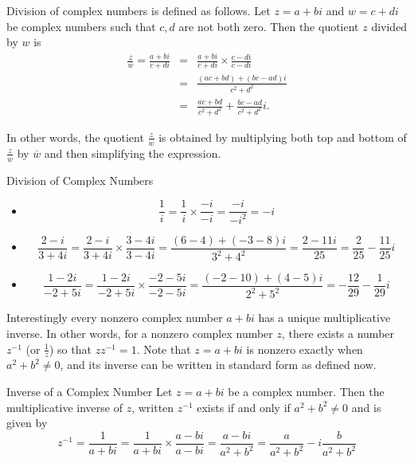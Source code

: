Division of complex numbers is defined as follows. Let $z=a+bi$ and $w=c+di$ be complex numbers such that $c,d$ are not both zero. Then the quotient $z$ divided by $w$ is
\begin{eqnarray*}
\frac{z}{w}=
\frac{a+bi}{c+di} & = & \frac{a+bi}{c+di}\times \frac{c-di}{c-di} \\
& = & \frac{(ac+bd)+(bc-ad)i}{c^2+d^2} \\
& = & \frac{ac+bd}{c^2+d^2} +\frac{bc-ad}{c^2+d^2}i.
\end{eqnarray*}

In other words, the quotient $\frac{z}{w}$ is obtained by multiplying
both top and bottom of $\frac{z}{w}$ by $\overline{w}$ and
then simplifying the expression.

\begin{example}{Division of Complex Numbers}\label{exa:divisioncomplex}
\begin{itemize}
\item
\[ \frac{1}{i} = \frac{1}{i}\times \frac{-i}{-i}
=\frac{-i}{-i^2}=-i \]

\item
\[ \frac{2-i}{3+4i} = \frac{2-i}{3+4i}\times \frac{3-4i}{3-4i}
=\frac{(6-4)+(-3-8)i}{3^2+4^2}
=\frac{2-11i}{25}
=\frac{2}{25} - \frac{11}{25}i \]

\item

\[ \frac{1-2i}{-2+5i} = \frac{1-2i}{-2+5i}\times \frac{-2-5i}{-2-5i}
=\frac{(-2-10) + (4-5)i}{2^2+5^2}
=-\frac{12}{29}-\frac{1}{29}i  \]
\end{itemize}
\end{example}

Interestingly every nonzero complex number $a+bi$ has a unique
multiplicative inverse. In other words, for a nonzero complex number
$z$, there exists a number $z^{-1}$ (or $\frac{1}{z}$) so that
$zz^{-1} = 1$. Note that $z=a+bi$ is nonzero exactly when
$a^{2}+b^{2}\neq 0$, and its inverse can be written in standard form as defined now. 

\begin{definition}{Inverse of a Complex Number}\label{def:complexinverse}
Let $z = a+bi$ be a complex number. Then the multiplicative inverse of $z$, written $z^{-1}$ exists if and only if $a^{2}+b^{2}\neq 0$ and is given by 
\begin{equation*}
z^{-1} = \frac{1}{a+bi}  = \frac{1}{a+bi}\times \frac{a-bi}{a-bi}=\frac{a-bi}{a^{2}+b^{2}}=\frac{a}{a^{2}+b^{2}}-i\frac{b}{
a^{2}+b^{2}}
\end{equation*}
\end{definition}

